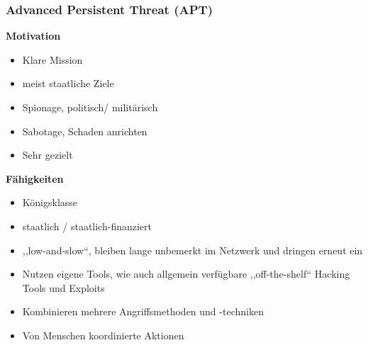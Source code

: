 \subsubsection{Advanced Persistent Threat (APT)}
\vspace{-8pt}
\begin{multicols*}{2}
    \textbf{Motivation}
    \begin{itemize}
        \item Klare Mission
        \item meist staatliche Ziele
        \item Spionage, politisch/ militärisch
        \item Sabotage, Schaden anrichten
        \item Sehr gezielt
    \end{itemize}
    \vfill
    \columnbreak
    \textbf{Fähigkeiten}
    \begin{itemize}
        \item Königsklasse
        \item staatlich / staatlich-finanziert
        \item ,,low-and-slow``, bleiben lange unbemerkt im Netzwerk und dringen erneut ein
        \item Nutzen eigene Tools, wie auch allgemein verfügbare ,,off-the-shelf`` Hacking Tools und Exploits
        \item Kombinieren mehrere Angriffsmethoden und -techniken
        \item Von Menschen koordinierte Aktionen
    \end{itemize}
\end{multicols*}
\vspace{-8pt}


